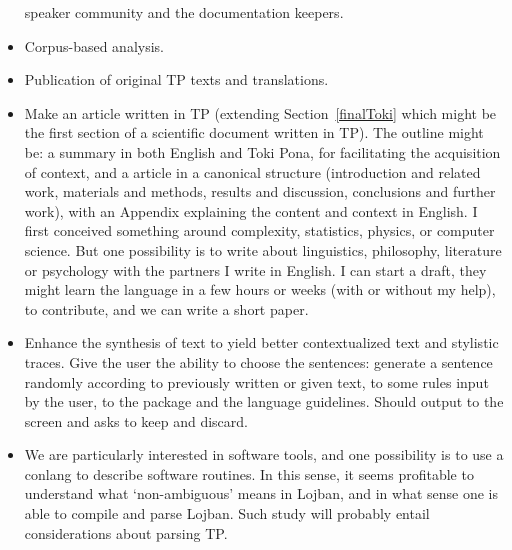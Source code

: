 \documentclass{article}
\begin{document}
\begin{itemize}
    speaker community and the documentation keepers.
  \item Corpus-based analysis.
  \item Publication of original TP texts and translations.
  \item Make an article written in TP
    (extending Section~\ref{finalToki} which might be the
    first section of a scientific document written in TP).
    The outline might be:
    a summary in both English and Toki Pona, for
    facilitating the acquisition of context,
    and a article in a canonical structure
    (introduction and related work, materials and methods,
    results and discussion, conclusions and further work),
    with an Appendix explaining the content and context in English.
    I first conceived something around complexity, statistics, physics, or computer science.
    But one possibility is to write about linguistics, philosophy, literature
    or psychology with the partners I write in English.
    I can start a draft,
    they might learn the language in a few hours or weeks
    (with or without my help),
    to contribute, and we can write a short paper.
  \item Enhance the synthesis of text to yield better contextualized text
    and stylistic traces.
    Give the user the ability to choose the sentences:
    generate a sentence randomly according to
    previously written or given text,
    to some rules input by the user,
    to the package and the language guidelines.
    Should output to the screen and asks to keep and discard.
  \item We are particularly interested in software tools,
    and one possibility is to use a conlang to describe software
    routines.
    In this sense, it seems profitable
    to understand what `non-ambiguous' means in Lojban,
    and in what sense one is able to compile and parse Lojban.
    Such study will probably entail considerations about
    parsing TP.
\end{itemize}
\end{document}
